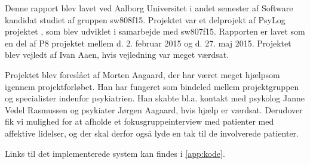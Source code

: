 Denne rapport blev lavet ved Aalborg Universitet i andet semester af Software kandidat studiet af gruppen sw808f15.
Projektet var et delprojekt af PsyLog projektet \citep{misc:faellesrapp}, som blev udviklet i samarbejde med sw807f15.
Rapporten er lavet som en del af P8 projektet mellem d. 2. februar 2015 og d. 27. maj 2015.
Projektet blev vejledt af Ivan Aaen, hvis vejledning var meget værdsat.

Projektet blev foreslået af Morten Aagaard, der har været meget hjælpsom igennem projektforløbet.
Han har fungeret som bindeled mellem projektgruppen og specialister indenfor psykiatrien. 
Han skabte bl.a. kontakt med psykolog Janne Vedel Rasmussen og psykiater Jørgen Aagaard, hvis hjælp er værdsat.
Derudover fik vi mulighed for at afholde et fokusgruppeinterview med patienter med affektive lidelser, og der skal derfor også lyde en tak til de involverede patienter.

Links til det implementerede system kan findes i \cref{app:kode}.